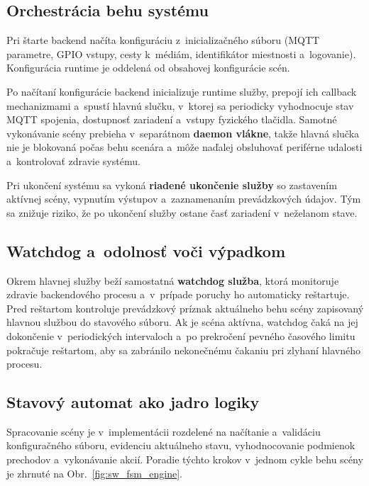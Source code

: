 \subsection{Orchestrácia behu systému}
\label{SWOrchestracia}

Pri štarte backend načíta konfiguráciu z~inicializačného súboru
(MQTT parametre, GPIO vstupy, cesty k~médiám, identifikátor
miestnosti a~logovanie). Konfigurácia runtime je oddelená
od obsahovej konfigurácie scén.

Po načítaní konfigurácie backend inicializuje runtime služby,
prepojí ich callback mechanizmami a~spustí hlavnú slučku,
v~ktorej sa periodicky vyhodnocuje stav MQTT spojenia,
dostupnosť zariadení a~vstupy fyzického tlačidla. Samotné vykonávanie
scény prebieha v~separátnom \textbf{daemon vlákne}, takže hlavná slučka
nie je blokovaná počas behu scenára a~môže naďalej obsluhovať
periférne udalosti a~kontrolovať zdravie systému.

Pri ukončení systému sa vykoná \textbf{riadené ukončenie služby}
so zastavením aktívnej scény, vypnutím výstupov a~zaznamenaním
prevádzkových údajov. Tým sa znižuje riziko, že po ukončení služby
ostane časť zariadení v~neželanom stave.

\subsection{Watchdog a~odolnosť voči výpadkom}
\label{SWWatchdog}

Okrem hlavnej služby beží samostatná \textbf{watchdog služba},
ktorá monitoruje zdravie backendového procesu a~v~prípade poruchy
ho automaticky reštartuje. Pred reštartom kontroluje prevádzkový príznak
aktuálneho behu scény zapisovaný hlavnou službou do stavového súboru.
Ak je scéna aktívna, watchdog čaká na jej dokončenie v~periodických
intervaloch a~po prekročení pevného časového limitu pokračuje
reštartom, aby sa zabránilo nekonečnému čakaniu pri zlyhaní hlavného
procesu.

\subsection{Stavový automat ako jadro logiky}
\label{SWFSM}

Spracovanie scény je v~implementácii rozdelené na načítanie
a~validáciu konfiguračného súboru, evidenciu aktuálneho stavu,
vyhodnocovanie podmienok prechodov a~vykonávanie akcií. Poradie týchto
krokov v~jednom cykle behu scény je zhrnuté na
Obr.~\ref{fig:sw_fsm_engine}.

